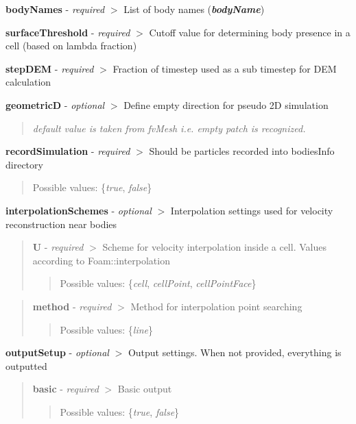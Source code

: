{\bfseries{body\+Names}} -\/ {\itshape required} $>$ List of body names ({\itshape {\bfseries{body\+Name}}})

{\bfseries{surface\+Threshold}} -\/ {\itshape required} $>$ Cutoff value for determining body presence in a cell (based on lambda fraction)

{\bfseries{step\+D\+EM}} -\/ {\itshape required} $>$ Fraction of timestep used as a sub timestep for D\+EM calculation

{\bfseries{geometricD}} -\/ {\itshape optional} $>$ Define empty direction for pseudo 2D simulation \begin{quote}
{\itshape default value is taken from fv\+Mesh i.\+e. empty patch is recognized.} \end{quote}


{\bfseries{record\+Simulation}} -\/ {\itshape required} $>$ Should be particles recorded into bodies\+Info directory \begin{quote}
Possible values\+: \{{\itshape true}, {\itshape false}\} \end{quote}


{\bfseries{interpolation\+Schemes}} -\/ {\itshape optional} $>$ Interpolation settings used for velocity reconstruction near bodies

\begin{quote}
{\bfseries{U}} -\/ {\itshape required} $>$ Scheme for velocity interpolation inside a cell. Values according to Foam\+::interpolation \begin{quote}
Possible values\+: \{{\itshape cell}, {\itshape cell\+Point}, {\itshape cell\+Point\+Face}\} \end{quote}
\end{quote}


\begin{quote}
{\bfseries{method}} -\/ {\itshape required} $>$ Method for interpolation point searching \begin{quote}
Possible values\+: \{{\itshape line}\} \end{quote}
\end{quote}


{\bfseries{output\+Setup}} -\/ {\itshape optional} $>$ Output settings. When not provided, everything is outputted

\begin{quote}
{\bfseries{basic}} -\/ {\itshape required} $>$ Basic output \begin{quote}
Possible values\+: \{{\itshape true}, {\itshape false}\} \end{quote}
\end{quote}


